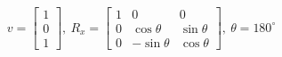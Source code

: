 \documentclass[preview]{standalone}
\begin{document}
\begin{align*}
v = \begin{bmatrix}
        1\\
        0\\
        1
        \end{bmatrix}, \ 
        R_x = \begin{bmatrix}
        1 & 0 & 0\\
        0 & \cos \theta  & \sin \theta \\
        0 & -\sin \theta  & \cos \theta 
        \end{bmatrix}, \ 
        \theta = 180^\circ
\end{align*}
\end{document}
